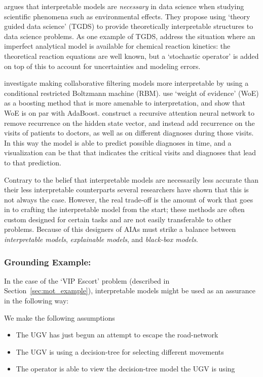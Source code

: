 \citet{Kumar2016-yw,Faghmous2014-og} argues that interpretable models are \emph{necessary} in data science when studying scientific phenomena such as environmental effects. They propose using `theory guided data science' (TGDS) to provide theoretically interpretable structures to data science problems. As one example of TGDS, \citet{Morrison2016-fz} address the situation where an imperfect analytical model is available for chemical reaction kinetics: the theoretical reaction equations are well known, but a `stochastic operator' is added on top of this to account for uncertainties and modeling errors.

\citet{Abdollahi2016-vn} investigate making collaborative filtering models more interpretable by using a conditional restricted Boltzmann machine (RBM). \citet{Ridgeway1998-lv} use `weight of evidence' (WoE) as a boosting method that is more amenable to interpretation, and show that WoE is on par with AdaBoost. \citet{Choi2016-by} construct a recursive attention neural network to remove recurrence on the hidden state vector, and instead add recurrence on the visits of patients to doctors, as well as on different diagnoses during those visits. In this way the model is able to predict possible diagnoses in time, and a visualization can be that that indicates the critical visits and diagnoses that lead to that prediction.

Contrary to the belief that interpretable models are necessarily less accurate than their less interpretable counterparts several researchers have shown that this is not always the case. However, the real trade-off is the amount of work that goes in to crafting the interpretable model from the start; these methods are often custom designed for certain tasks and are not easily transferable to other problems. Because of this designers of AIAs must strike a balance between \emph{interpretable models}, \emph{explainable models}, and \emph{black-box models}.

\subsubsection{Grounding Example:}
In the case of the `VIP Escort' problem (described in Section~\ref{sec:mot_example}), interpretable models might be used as an assurance in the following way:

We make the following assumptions

\begin{itemize}
    \item The UGV has just begun an attempt to escape the road-network
    \item The UGV is using a decision-tree for selecting different movements
    \item The operator is able to view the decision-tree model the UGV is using
\end{itemize}

